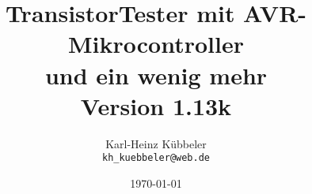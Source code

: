 \documentclass[pdftex,12pt,a4paper,oneside,english]{report}
\begin{document}
\newcommand\electricC {
\hspace{-14 pt}
\begin{circuitikz}
\draw (0,0) to[capacitor] (0:1);
\end{circuitikz}
\hspace{-6 pt}
}
\newcommand\electricR {
\hspace{-14 pt}
\begin{circuitikz}
\draw (0,0) to[european resistor] (0:1);
\end{circuitikz}
\hspace{-6 pt}
}
\newcommand\electricL {
\hspace{-14 pt}
\begin{circuitikz}
\draw (0,0) 
 to[american inductor] (-1,0) 
;\end{circuitikz}
\hspace{-6 pt}
}
\newcommand\electricDAK {
\begin{circuitikz}
\draw (0,0) to[full diode] (0:1);
\end{circuitikz}
}
\newcommand\electricDKA {
\begin{circuitikz}
\draw (0,0) to[full diode] (180:1);
\end{circuitikz}
}
\title{TransistorTester mit AVR-Mikrocontroller \\
und ein wenig mehr\\
Version 1.13k \\
}
\author{Karl-Heinz Kübbeler\\
\texttt{kh\_kuebbeler@web.de}}
\date{\today}
\maketitle
\tableofcontents













 
 
 
 
 
 





\end{document}
